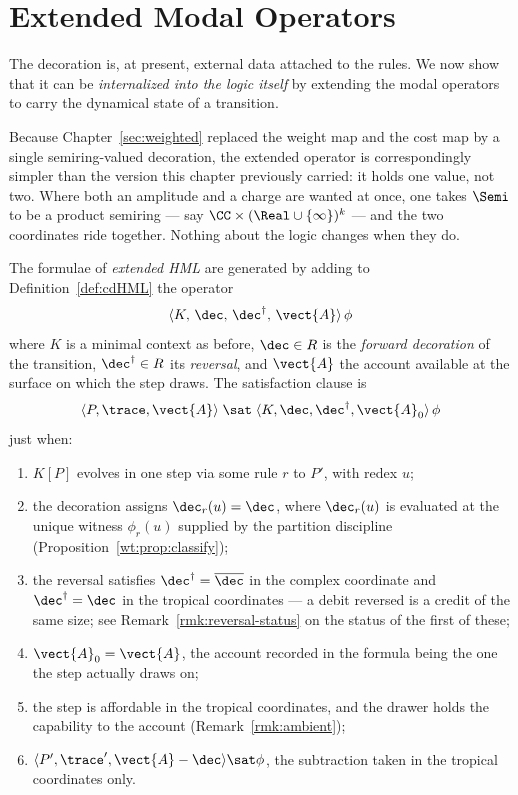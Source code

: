 \chapter{Extended Modal Operators}
\label{sec:extended-modal}

The decoration is, at present, external data attached to the rules.  We
now show that it can be \emph{internalized into the logic itself} by
extending the modal operators to carry the dynamical state of a
transition.

Because Chapter~\ref{sec:weighted} replaced the weight map and the cost
map by a single semiring-valued decoration, the extended operator is
correspondingly simpler than the version this chapter previously carried:
it holds one value, not two.  Where both an amplitude and a charge are
wanted at once, one takes $\Semi$ to be a product semiring --- say
$\CC \times (\Real\cup\{\infty\})^k$ --- and the two coordinates ride
together.  Nothing about the logic changes when they do.

\begin{definition}
\label{def:ext-modal}
The formulae of \emph{extended HML} are generated by adding to
Definition~\ref{def:cdHML} the operator
\[
  \langle K,\, \dec,\, \dec^{\dagger},\, \vect{A} \rangle\,\phi
\]
where $K$ is a minimal context as before, $\dec \in R$ is the
\emph{forward decoration} of the transition, $\dec^{\dagger} \in R$ its
\emph{reversal}, and $\vect{A}$ the account available at the surface on
which the step draws.  The satisfaction clause is
\[
  \langle P, \trace, \vect{A} \rangle \;\sat\;
  \langle K, \dec, \dec^{\dagger}, \vect{A}_0 \rangle\,\phi
\]
just when:
\begin{enumerate}[label=(\roman*)]
  \item $K[P]$ evolves in one step via some rule $r$ to $P'$, with redex
        $u$;
  \item the decoration assigns $\dec_r(u) = \dec$, where $\dec_r(u)$ is
        evaluated at the unique witness $\phi_r(u)$ supplied by the
        partition discipline (Proposition~\ref{wt:prop:classify});
  \item the reversal satisfies $\dec^{\dagger} = \overline{\dec}$ in the
        complex coordinate and $\dec^{\dagger} = \dec$ in the tropical
        coordinates --- a debit reversed is a credit of the same size;
        see Remark~\ref{rmk:reversal-status} on the status of the first
        of these;
  \item $\vect{A}_0 = \vect{A}$, the account recorded in the formula being
        the one the step actually draws on;
  \item the step is affordable in the tropical coordinates, and the drawer
        holds the capability to the account (Remark~\ref{rmk:ambient});
  \item $\langle P', \trace', \vect{A} - \dec \rangle \sat \phi$, the
        subtraction taken in the tropical coordinates only.
\end{enumerate}
\end{definition}

